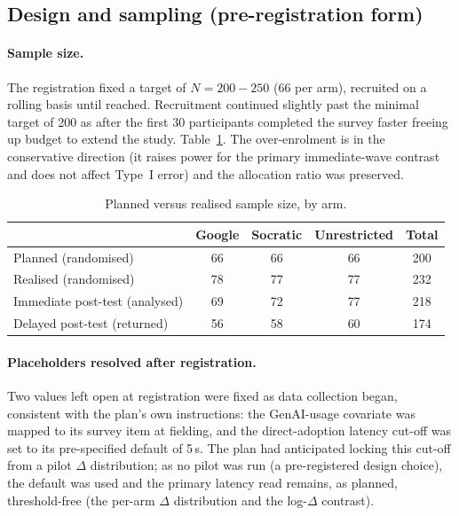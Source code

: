 \subsection{Design and sampling (pre-registration form)}
\label{app:dev-design}

\paragraph{Sample size.} The registration fixed a target of $N=200-250$ (66 per arm),
recruited on a rolling basis until reached. Recruitment continued slightly past 
the minimal target of 200 as after the first 30 participants completed the survey faster freeing up budget to extend the study.  Table~\ref{tab:dev-n}. 
The over-enrolment is in the conservative
direction (it raises power for the primary immediate-wave contrast and does not
affect Type~I error) and the allocation ratio was preserved.

\begin{table}[htbp]
  \centering
  \caption{Planned versus realised sample size, by arm.}
  \label{tab:dev-n}
  \small
  \begin{tabular}{lcccc}
    \toprule
     & Google & Socratic & Unrestricted & Total \\
    \midrule
    Planned (randomised)        & 66 & 66 & 66 & 200 \\
    Realised (randomised)       & 78 & 77 & 77 & 232 \\
    Immediate post-test (analysed) & 69 & 72 & 77 & 218 \\
    Delayed post-test (returned)   & 56 & 58 & 60 & 174 \\
    \bottomrule
  \end{tabular}
\end{table}

\paragraph{Placeholders resolved after registration.} Two values left open at
registration were fixed as data collection began, consistent with the plan's own
instructions: the GenAI-usage covariate was mapped to its survey item at
fielding, and the direct-adoption latency cut-off was set to its pre-specified
default of 5\,s. The plan had anticipated locking this cut-off from a pilot
$\Delta$ distribution; as no pilot was run (a pre-registered design choice), the
default was used and the primary latency read remains, as planned, threshold-free
(the per-arm $\Delta$ distribution and the log-$\Delta$ contrast).

